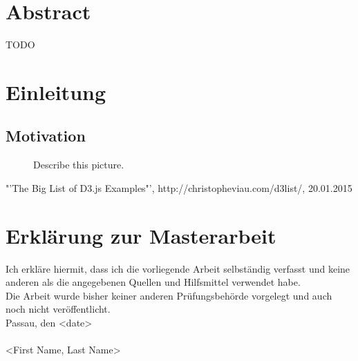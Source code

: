 \documentclass[12pt, a4paper,oneside]{report}
\begin{document}


\setcounter{tocdepth}{10}
\tableofcontents






\listoffigures
\listoftables

\titleformat{\chapter}{\LARGE\bfseries}{\thechapter}{1em}{}




\chapter*{Abstract}

TODO


\newpage
\chapter{Einleitung}

\section{Motivation}

\begin{figure}[!ht]
	\centering
	\caption{Describe this picture.}
	\label{fig:1}
\end{figure}







\begin{thebibliography}{12345678}
 "'The Big List of D3.js Examples"', http://christopheviau.com/d3list/, 20.01.2015

\end{thebibliography}

\newpage
\chapter*{Erklärung zur Masterarbeit}
Ich erkläre hiermit, dass ich die vorliegende Arbeit selbständig verfasst und keine anderen als die angegebenen Quellen und Hilfsmittel verwendet habe. \newline
\ \\
Die Arbeit wurde bisher keiner anderen Prüfungsbehörde vorgelegt und auch noch nicht veröffentlicht.\newline
\ \\
Passau, den <date>
\newline
\ \\
\ \\
<First Name, Last Name>
\end{document}
